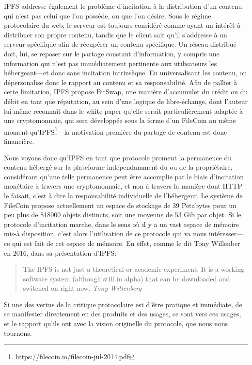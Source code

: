 \documentclass{article}
\begin{document}
IPFS addresse également le problème d'incitation à la distribution d'un contenu qui n'est pas celui que l'on possède, ou que l'on désire. Sous le régime protocolaire du web, le serveur est toujours considéré comme ayant un intérêt à distribuer son propre contenu, tandis que le client sait qu'il s'addresse à un serveur spécifique afin de récupérer un contenu spécifique. Un réseau distribué doit, lui, se reposer sur le partage constant d'information, y compris une information qui n'est pas immédiatement pertinente aux utilisateurs les hébergeant—et donc sans incitation intrinsèque. En universalisant les contenu, on dépersonalise donc le rapport au contenu et sa responsabilité. Afin de pallier à cette limitation, IPFS propose BitSwap, une manière d'accumuler du crédit ou du débit en tant que réputation, au sein d'une logique de libre-échange, dont l'auteur lui-même reconnaît dans le white paper qu'elle serait particulièrement adaptée à une cryptomonnaie, qui sera développée sous la forme d'un FileCoin au même moment qu'IPFS\footnote{https://filecoin.io/filecoin-jul-2014.pdf}—la motivation première du partage de contenu est donc financière.

Nous voyons donc qu'IPFS en tant que protocole promeut la permanence du contenu hébergé sur la plateforme indépendamment du ou de la propriétaire, considérant qu'une telle permanence peut être accomplie par le biais d'incitation monétaire à travers une cryptomonnaie, et non à travers la manière dont HTTP le faisait, c'est à dire la responsabilité individuelle de l'hébergeur. Le système de FileCoin propose actuellement un espace de stockage de 39 Petabytes pour un peu plus de 818000 objets distincts, soit une moyenne de 53 Gib par objet. Si le protocole d'incitation marche, dans le sens où il y a un vast espace de mémoire mis-à disposition, c'est alors l'utilisation de ce protocole qui va nous intéresser—ce qui est fait de cet espace de mémoire. En effet, comme le dit Tony Willenber en 2016, dans sa présentation d'IPFS:

\begin{quote}
    The IPFS is not just a theoretical or academic experiment. It is a working software system (although still in alpha) that can be downloaded and switched on right now. \emph{Tony Willenberg}
\end{quote}

Si une des vertus de la critique protocolaire est d'être pratique et immédiate, de se manifester directement en des produits et des usages, ce sont vers ces usages, et le rapport qu'ils ont avec la vision originelle du protocole, que nous nous tournons.
\end{document}
